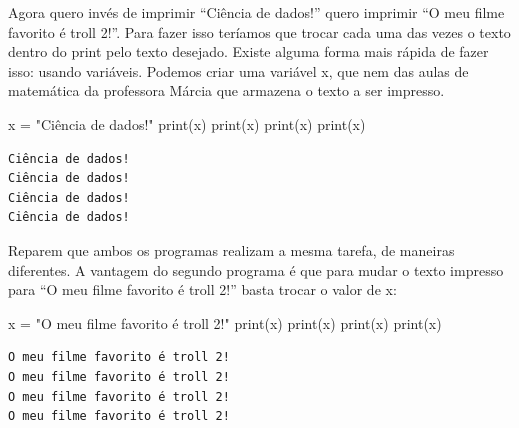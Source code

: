 \documentclass[
  letterpaper,
  DIV=11,
  numbers=noendperiod]{scrreprt}
\newenvironment{Shaded}{\begin{snugshade}}{\end{snugshade}}
\newcommand{\BuiltInTok}[1]{\textcolor[rgb]{0.00,0.23,0.31}{#1}}
\newcommand{\NormalTok}[1]{\textcolor[rgb]{0.00,0.23,0.31}{#1}}
\newcommand{\OperatorTok}[1]{\textcolor[rgb]{0.37,0.37,0.37}{#1}}
\newcommand{\StringTok}[1]{\textcolor[rgb]{0.13,0.47,0.30}{#1}}
\begin{document}
Agora quero invés de imprimir ``Ciência de dados!'' quero imprimir ``O
meu filme favorito é troll 2!''. Para fazer isso teríamos que trocar
cada uma das vezes o texto dentro do print pelo texto desejado. Existe
alguma forma mais rápida de fazer isso: usando variáveis. Podemos criar
uma variável x, que nem das aulas de matemática da professora Márcia que
armazena o texto a ser impresso.

\begin{Shaded}
\begin{Highlighting}[]
\NormalTok{x }\OperatorTok{=} \StringTok{"Ciência de dados!"}
\BuiltInTok{print}\NormalTok{(x)}
\BuiltInTok{print}\NormalTok{(x)}
\BuiltInTok{print}\NormalTok{(x)}
\BuiltInTok{print}\NormalTok{(x)}
\end{Highlighting}
\end{Shaded}

\begin{tcolorbox}[enhanced jigsaw, breakable, leftrule=.75mm, left=2mm, opacityback=0, bottomrule=.15mm, toprule=.15mm, rightrule=.15mm, arc=.35mm, colback=white]

\begin{verbatim}
Ciência de dados!
Ciência de dados!
Ciência de dados!
Ciência de dados!
\end{verbatim}

\end{tcolorbox}

Reparem que ambos os programas realizam a mesma tarefa, de maneiras
diferentes. A vantagem do segundo programa é que para mudar o texto
impresso para ``O meu filme favorito é troll 2!'' basta trocar o valor
de x:

\begin{Shaded}
\begin{Highlighting}[]
\NormalTok{x }\OperatorTok{=} \StringTok{"O meu filme favorito é troll 2!"}
\BuiltInTok{print}\NormalTok{(x)}
\BuiltInTok{print}\NormalTok{(x)}
\BuiltInTok{print}\NormalTok{(x)}
\BuiltInTok{print}\NormalTok{(x)}
\end{Highlighting}
\end{Shaded}

\begin{tcolorbox}[enhanced jigsaw, breakable, leftrule=.75mm, left=2mm, opacityback=0, bottomrule=.15mm, toprule=.15mm, rightrule=.15mm, arc=.35mm, colback=white]

\begin{verbatim}
O meu filme favorito é troll 2!
O meu filme favorito é troll 2!
O meu filme favorito é troll 2!
O meu filme favorito é troll 2!
\end{verbatim}

\end{tcolorbox}
\end{document}
